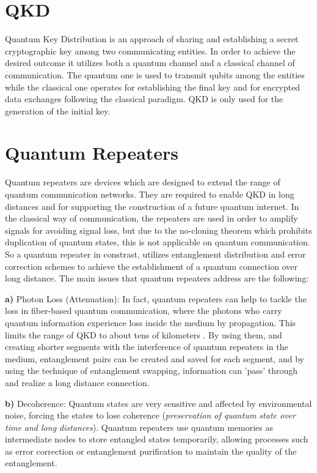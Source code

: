 \documentclass[12pt,a4paper] {report}
\begin{document}
		\section{QKD}
		Quantum Key Distribution is an approach of sharing and establishing a secret cryptographic key 
		among two communicating entities\cite{powergrid}.
		In order to achieve the desired outcome it utilizes both a quantum channel and a classical channel 
		of communication. The quantum one is used to transmit qubits among the entities while the classical 
		one operates for establishing the final key and for encrypted data exchanges following the classical 
		paradigm. QKD is only used for the generation of the initial key.

		\section{Quantum Repeaters}
		
		Quantum repeaters are devices which are designed to extend the range of quantum communication networks. They 
		are required to enable QKD in long distances and for supporting the construction of a future quantum internet.
		In the classical way of communication, the repeaters are used in order to amplify signals 
		for avoiding signal loss, but due to the no-cloning theorem which prohibits duplication of quantum states,
		this is not applicable on quantum communication. So a quantum repeater in constrast, utilizes entanglement distribution 
		and error correction schemes to achieve the establishment of a quantum connection over long distance.
		The main issues that quantum repeaters address are the following:

		\textbf{a)} Photon Loss (Attenuation):
		In fact, quantum repeaters can help to tackle the loss in fiber-based quantum communication,
		where the photons who carry quantum information experience loss inside the medium by propagation. 
		This limits the range of QKD to about tens of kilometers \cite{repeater1}. 
		By using them, and creating shorter segments with the interference of quantum repeaters in the medium,
		entanglement pairs can be created and saved for each segment, 
		and by using the technique of entanglement swapping, information can 'pass' through and realize a long distance connection.

		\textbf{b)} Decoherence:
		Quantum states are very sensitive and affected by environmental noise, forcing the states to lose coherence (\textit{preservation of quantum
		state over time and long distances}).
		Quantum repeaters use quantum memories\cite{memories} as intermediate nodes to store entangled states 
		temporarily, allowing processes such as error correction or entanglement purification to maintain 
		the quality of the entanglement.
		
\end{document}
